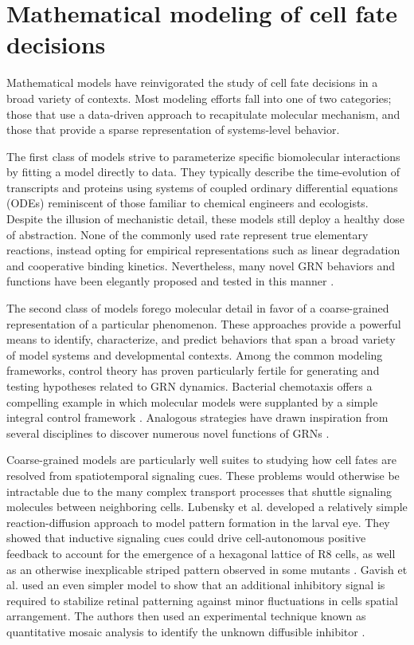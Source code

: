 \section{Mathematical modeling of cell fate decisions}

Mathematical models have reinvigorated the study of cell fate decisions in a broad variety of contexts. Most modeling efforts fall into one of two categories; those that use a data-driven approach to recapitulate molecular mechanism, and those that provide a sparse representation of systems-level behavior. 

The first class of models strive to parameterize specific biomolecular interactions by fitting a model directly to data. They typically describe the time-evolution of transcripts and proteins using systems of coupled ordinary differential equations (ODEs) reminiscent of those familiar to chemical engineers and ecologists. Despite the illusion of mechanistic detail, these models still deploy a healthy dose of abstraction. None of the commonly used rate represent true elementary reactions, instead opting for empirical representations such as linear degradation and cooperative binding kinetics. Nevertheless, many novel GRN behaviors and functions have been elegantly proposed and tested in this manner \cite{Barkai1997b,Yu2008a,Paulsen2011}. 

The second class of models forego molecular detail in favor of a coarse-grained representation of a particular phenomenon. These approaches provide a powerful means to identify, characterize, and predict behaviors that span a broad variety of model systems and developmental contexts. Among the common modeling frameworks, control theory has proven particularly fertile for generating and testing hypotheses related to GRN dynamics. Bacterial chemotaxis offers a compelling example in which molecular models were supplanted by a simple integral control framework \cite{Barkai1997b,Alon1999,Yi2000,Muzzey2009}. Analogous strategies have drawn inspiration from several disciplines to discover numerous novel functions of GRNs \cite{Ma2009,Colman-Lerner2005,Rahimi2016,Benzinger2018,Adler2018,Yordanov2018}.

Coarse-grained models are particularly well suites to studying how cell fates are resolved from spatiotemporal signaling cues. These problems would otherwise be intractable due to the many complex transport processes that shuttle signaling molecules between neighboring cells. Lubensky et al. developed a relatively simple reaction-diffusion approach to model pattern formation in the larval eye. They showed that inductive signaling cues could drive cell-autonomous positive feedback to account for the emergence of a hexagonal lattice of R8 cells, as well as an otherwise inexplicable striped pattern observed in some mutants \cite{Lubensky2011}. Gavish et al. used an even simpler model to show that an additional inhibitory signal is required to stabilize retinal patterning against minor fluctuations in cells spatial arrangement. The authors then used an experimental technique known as quantitative mosaic analysis to identify the unknown diffusible inhibitor \cite{Gavish2016}.

